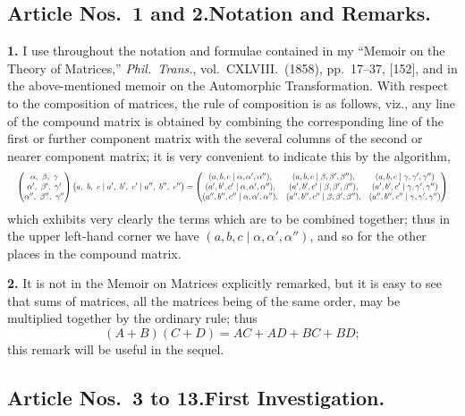 \documentclass[11pt]{article}
\begin{document}
\subsection*{Article Nos.\ 1 and 2.\quad Notation and Remarks.}

\textbf{1.} I use throughout the notation and formulae contained in my ``Memoir on the Theory of Matrices,'' \textit{Phil.\ Trans.}, vol.~CXLVIII.~(1858), pp.~17--37, [152], and in the above-mentioned memoir on the Automorphic Transformation. With respect to the composition of matrices, the rule of composition is as follows, viz., any line of the compound matrix is obtained by combining the corresponding line of the first or further component matrix with the several columns of the second or nearer component matrix; it is very convenient to indicate this by the algorithm,
\[
\resizebox{\textwidth}{!}{$\displaystyle
\begin{pmatrix} \alpha,\ \beta,\ \gamma \\ \alpha',\ \beta',\ \gamma' \\ \alpha'',\ \beta'',\ \gamma'' \end{pmatrix}
\bigl( a,\ b,\ c \mid a',\ b',\ c' \mid a'',\ b'',\ c'' \bigr) =
\begin{pmatrix} (a,b,c \mid \alpha, \alpha', \alpha''), & (a,b,c \mid \beta, \beta', \beta''), & (a,b,c \mid \gamma, \gamma', \gamma'') \\
(a',b',c' \mid \alpha, \alpha', \alpha''), & (a',b',c' \mid \beta, \beta', \beta''), & (a',b',c' \mid \gamma, \gamma', \gamma'') \\
(a'',b'',c'' \mid \alpha, \alpha', \alpha''), & (a'',b'',c'' \mid \beta, \beta', \beta''), & (a'',b'',c'' \mid \gamma, \gamma', \gamma'') \end{pmatrix}
$}
\]
which exhibits very clearly the terms which are to be combined together; thus in the upper left-hand corner we have $(a, b, c \mid \alpha, \alpha', \alpha'')$, and so for the other places in the compound matrix.

\textbf{2.} It is not in the Memoir on Matrices explicitly remarked, but it is easy to see that sums of matrices, all the matrices being of the same order, may be multiplied together by the ordinary rule; thus
\[
(A + B)(C + D) = AC + AD + BC + BD;
\]
this remark will be useful in the sequel.

\subsection*{Article Nos.\ 3 to 13.\quad First Investigation.}
\end{document}
